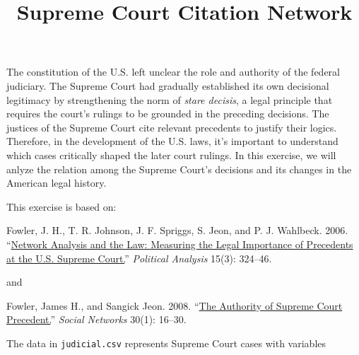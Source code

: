 \documentclass[]{article}
\title{Supreme Court Citation Network}
\author{}
\date{}
\begin{document}
\maketitle


The constitution of the U.S. left unclear the role and authority of the
federal judiciary. The Supreme Court had gradually established its own
decisional legitimacy by strengthening the norm of \emph{stare decisis},
a legal principle that requires the court's rulings to be grounded in
the preceding decisions. The justices of the Supreme Court cite relevant
precedents to justify their logics. Therefore, in the development of the
U.S. laws, it's important to understand which cases critically shaped
the later court rulings. In this exercise, we will anlyze the relation
among the Supreme Court's decisions and its changes in the American
legal history.

This exercise is based on:

Fowler, J. H., T. R. Johnson, J. F. Spriggs, S. Jeon, and P. J.
Wahlbeck. 2006. ``\href{http://dx.doi.org/10.1093/pan/mpm011}{Network
Analysis and the Law: Measuring the Legal Importance of Precedents at
the U.S. Supreme Court.}'' \emph{Political Analysis} 15(3): 324--46.

and

Fowler, James H., and Sangick Jeon. 2008.
``\href{http://dx.doi.org/10.1016/j.socnet.2007.05.001}{The Authority of
Supreme Court Precedent.}'' \emph{Social Networks} 30(1): 16--30.

The data in \texttt{judicial.csv} represents Supreme Court cases with
variables
\end{document}
